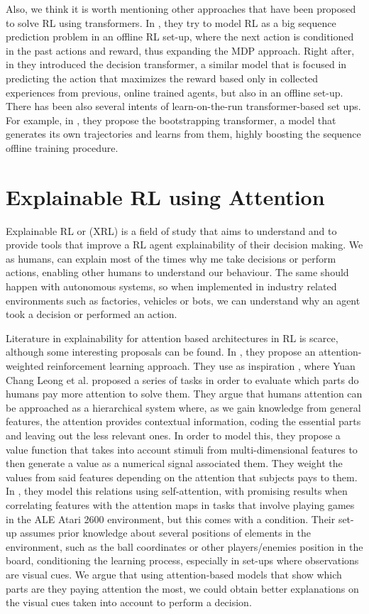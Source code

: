Also, we think it is worth mentioning other approaches that have been proposed to solve RL using transformers. In \cite{janner2021offline}, they try to model RL as a big sequence prediction problem in an offline RL set-up, where the next action is conditioned in the past actions and reward, thus expanding the MDP approach. Right after, in \cite{chen2021decision} they introduced the decision transformer, a similar model that is focused in predicting the action that maximizes the reward based only in collected experiences from previous, online trained agents, but also in an offline set-up. There has been also several intents of learn-on-the-run transformer-based set ups. For example, in \cite{wang2022bootstrapped}, they propose the bootstrapping transformer, a model that generates its own trajectories and learns from them, highly boosting the sequence offline training procedure.


\section{Explainable RL using Attention}
Explainable RL or (XRL) is a field of study that aims to understand and to provide tools that improve a RL agent explainability of their decision making.
We as humans, can explain most of the times why me take decisions or perform actions, enabling other humans to understand our behaviour. The same should happen with autonomous systems, so when implemented in industry related environments such as factories, vehicles or bots, we can understand why an agent took a decision or performed an action.

Literature in explainability for attention based architectures in RL is scarce, although some interesting proposals can be found. In \cite{BRAMLAGE202210}, they propose an attention-weighted reinforcement learning approach. They use as inspiration \cite{LEONG2017451}, where Yuan Chang Leong et al. proposed a series of tasks in order to evaluate which parts do humans pay more attention to solve them. They argue that humans attention can be approached as a hierarchical system where, as we gain knowledge from general features, the attention provides contextual information, coding the essential parts and leaving out the less relevant ones. In order to model this, they propose a value function that takes into account stimuli from multi-dimensional features to then generate a value as a numerical signal associated them. They weight the values from said features depending on the attention that subjects pays to them. In \cite{BRAMLAGE202210}, they model this relations using self-attention, with promising results when correlating features with the attention maps in tasks that involve playing games in the ALE Atari 2600 environment, but this comes with a condition. Their set-up assumes prior knowledge about several positions of elements in the environment, such as the ball coordinates or other players/enemies position in the board, conditioning the learning process, especially in set-ups where observations are visual cues. We argue that using attention-based models that show which parts are they paying attention the most, we could obtain better explanations on the visual cues taken into account to perform a decision.
